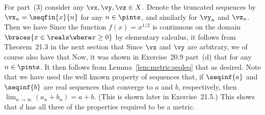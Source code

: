 {{    For part~(3) consider any $\vx,\vy,\vz \in X$.
    Denote the truncated sequences by $\vx_n = \seqfin{x}{n}$ for any $n \in \pints$, and similarly for $\vy_n$ and $\vz_n$.
    Then we have
    Since the function $f(x) = x^{1/2}$ is continuous on the domain $\braces{x \in \reals \where x \geq 0}$ by elementary calculus, it follows from Theorem~21.3 in the next section that
    Since $\vx$ and $\vy$ are arbitrary, we of course also have that
    Now, it was shown in Exercise~20.9 part~(d) that
    for any $n \in \pints$.
    It then follows from Lemma~\ref{lem:metric:seqleq} that
    as desired.
    Note that we have used the well known property of sequences that, if $\seqinf{a}$ and $\seqinf{b}$ are real sequences that converge to $a$ and $b$, respectively, then $\lim_{n \to \infty} (a_n + b_n) = a + b$. (This is shown later in Exercise~21.5.)
    This shows that $d$ has all three of the properties required to be a metric.
  }
}

